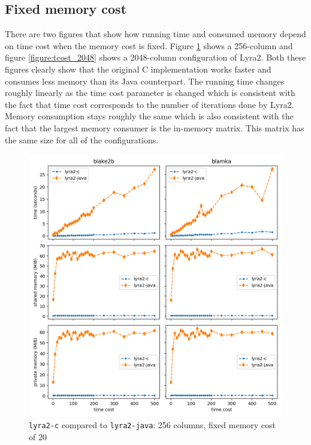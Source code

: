 \subsection{Fixed memory cost}

There are two figures that show how running time and consumed memory depend on time cost when the memory cost is fixed. Figure \ref{figure:tcost_256} shows a 256-column and figure \ref{figure:tcost_2048} shows a 2048-column configuration of Lyra2. Both these figures clearly show that the original C implementation works faster and consumes less memory than its Java counterpart.
The running time changes roughly linearly as the time cost parameter is changed which is consistent with the fact that time cost corresponds to the number of iterations done by Lyra2. Memory consumption stays roughly the same which is also consistent with the fact that the largest memory consumer is the in-memory matrix. This matrix has the same size for all of the configurations.

\begin{figure}[H]
    \centering
    \includegraphics[width=\linewidth]{figures/tcost_256}
    \caption{\texttt{lyra2-c} compared to \texttt{lyra2-java}: 256 columns, fixed memory cost of 20}
    \label{figure:tcost_256}
\end{figure}

